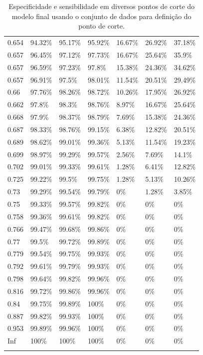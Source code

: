 \documentclass[a4paper,titlepage]{ppgi}\usepackage[]{graphicx}\usepackage[]{color}
\begin{document}
\begin{longtable}{l l l l l l l}
0.654 & 94.32\% & 95.17\% & 95.92\% & 16.67\% & 26.92\% & 37.18\% \\
0.657 & 96.45\% & 97.12\% & 97.73\% & 16.67\% & 25.64\% & 35.9\% \\
0.657 & 96.59\% & 97.23\% & 97.8\% & 15.38\% & 24.36\% & 34.62\% \\
0.657 & 96.91\% & 97.5\% & 98.01\% & 11.54\% & 20.51\% & 29.49\% \\
0.66 & 97.76\% & 98.26\% & 98.72\% & 10.26\% & 17.95\% & 26.92\% \\
0.662 & 97.8\% & 98.3\% & 98.76\% & 8.97\% & 16.67\% & 25.64\% \\
0.668 & 97.9\% & 98.37\% & 98.79\% & 7.69\% & 15.38\% & 24.36\% \\
0.687 & 98.33\% & 98.76\% & 99.15\% & 6.38\% & 12.82\% & 20.51\% \\
0.689 & 98.62\% & 99.01\% & 99.36\% & 5.13\% & 11.54\% & 19.23\% \\
0.699 & 98.97\% & 99.29\% & 99.57\% & 2.56\% & 7.69\% & 14.1\% \\
0.702 & 99.01\% & 99.33\% & 99.61\% & 1.28\% & 6.41\% & 12.82\% \\
0.725 & 99.22\% & 99.5\% & 99.75\% & 1.28\% & 5.13\% & 10.26\% \\
0.73 & 99.29\% & 99.54\% & 99.79\% & 0\% & 1.28\% & 3.85\% \\
0.75 & 99.33\% & 99.57\% & 99.82\% & 0\% & 0\% & 0\% \\
0.758 & 99.36\% & 99.61\% & 99.82\% & 0\% & 0\% & 0\% \\
0.766 & 99.47\% & 99.68\% & 99.86\% & 0\% & 0\% & 0\% \\
0.77 & 99.5\% & 99.72\% & 99.89\% & 0\% & 0\% & 0\% \\
0.779 & 99.54\% & 99.75\% & 99.93\% & 0\% & 0\% & 0\% \\
0.792 & 99.61\% & 99.79\% & 99.93\% & 0\% & 0\% & 0\% \\
0.798 & 99.64\% & 99.82\% & 99.96\% & 0\% & 0\% & 0\% \\
0.816 & 99.72\% & 99.86\% & 99.96\% & 0\% & 0\% & 0\% \\
0.84 & 99.75\% & 99.89\% & 100\% & 0\% & 0\% & 0\% \\
0.887 & 99.82\% & 99.93\% & 100\% & 0\% & 0\% & 0\% \\
0.953 & 99.89\% & 99.96\% & 100\% & 0\% & 0\% & 0\% \\
Inf & 100\% & 100\% & 100\% & 0\% & 0\% & 0\% \\
\caption{Especificidade e sensibilidade em diversos pontos de corte do modelo
final usando o conjunto de dados para definição do ponto de corte.}
\end{longtable}
\end{document}
